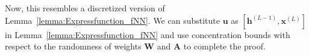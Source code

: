     Now, this resembles a discretized version of Lemma~\ref{lemma:Expressfunction_fNN}. We can substitute $\mathbf{u}$ as $[\mathbf{h}^{(L-1)}, \mathbf{x}^{(L)}]$ in Lemma~\ref{lemma:Expressfunction_fNN} and use concentration bounds with respect to the randomness of weights $\mathbf{W}$ and $\mathbf{A}$ to complete the proof. 
